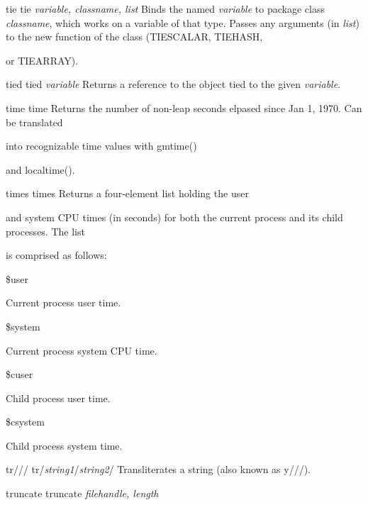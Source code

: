 \documentclass[a4paper,11pt]{book}
\begin{document}
\noindent 

\noindent tie tie \textit{variable, classname, list }Binds the named \textit{variable }to package class \textit{classname}, which works on a variable of that type. Passes any arguments (in \textit{list}) to the new function of the class (TIESCALAR, TIEHASH,

\noindent or TIEARRAY).

\noindent 

\noindent tied tied \textit{variable }Returns a reference to the object tied to the given \textit{variable}.

\noindent 

\noindent time time Returns the number of non-leap seconds elpased since Jan 1, 1970. Can be translated

\noindent into recognizable time values with gmtime()

\noindent and localtime().

\noindent 

\noindent times times Returns a four-element list holding the user

\noindent and system CPU times (in seconds) for both the current process and its child processes. The list

\noindent is comprised as follows:

\noindent 

\noindent \$user

\noindent 

\noindent Current process user time.

\noindent 

\noindent \$system

\noindent 

\noindent Current process system CPU time.

\noindent 

\noindent \$cuser

\noindent 

\noindent Child process user time.

\noindent 

\noindent \$csystem

\noindent 

\noindent Child process system time.

\noindent 

\noindent tr/// tr/\textit{string1}/\textit{string2}/ Transliterates a string (also known as y///).

\noindent 

\noindent truncate truncate \textit{filehandle, length}
\end{document}

